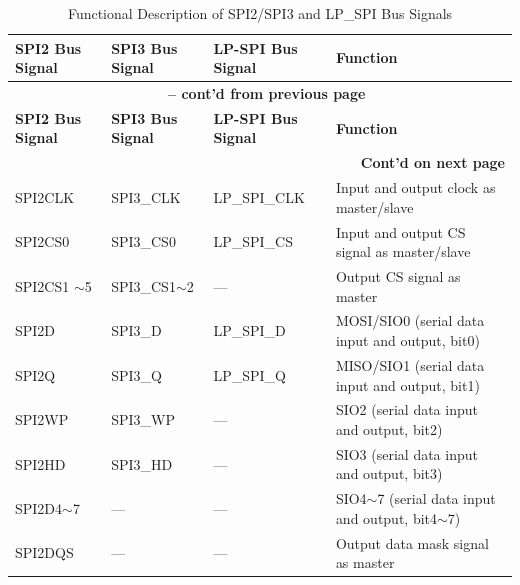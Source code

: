 \documentclass[main\_\_EN.tex]{subfiles}
\begin{document}
\begin{ThreePartTable}

\begin{longtable}[c]{|l|l|l|l|}
\caption{ Functional Description of SPI2/SPI3 and LP\_SPI Bus Signals}
\label{table:SPI_signals}\\
\hline
    \rowcolor{lightgray}
    \textbf{SPI2 Bus Signal}& \textbf{SPI3 Bus Signal}&  \textbf{LP-SPI Bus Signal} & \textbf{Function} \\
    \hline
    \endfirsthead
    \multicolumn{4}{c}{\bfseries \tablename\ \thetable{} -- cont'd from previous page}\\\hline
    \rowcolor{lightgray}
    \textbf{SPI2 Bus Signal}& \textbf{SPI3 Bus Signal}&  \textbf{LP-SPI Bus Signal} & \textbf{Function} \\ \hline
    \endhead

    \multicolumn{4}{r}{\textbf{Cont'd on next page}} \\
    \endfoot
    \endlastfoot
    SPI2CLK     & SPI3\_CLK     & LP\_SPI\_CLK  & Input and output clock as master/slave \\\hline
    SPI2CS0     & SPI3\_CS0     & LP\_SPI\_CS   & Input and output CS signal as master/slave \\\hline
    SPI2CS1 $\sim$5 & SPI3\_CS1$\sim$2  & --- & Output CS signal as master \\\hline
    SPI2D       & SPI3\_D      & LP\_SPI\_D  & MOSI/SIO0 (serial data input and output, bit0)\\
    \hline
    SPI2Q       & SPI3\_Q      & LP\_SPI\_Q & MISO/SIO1 (serial data input and output, bit1) \\\hline
    SPI2WP      & SPI3\_WP     & --- & SIO2 (serial data input and output, bit2) \\\hline
    SPI2HD      & SPI3\_HD     & --- & SIO3 (serial data input and output, bit3) \\\hline
    SPI2D4$\sim$7 &    ---  & ---  & SIO4$\sim$7 (serial data input and output, bit4$\sim$7) \\\hline
    SPI2DQS     & ---    & ---         & Output data mask signal as master \\\hline

\end{longtable}

\end{ThreePartTable}
\end{document}
